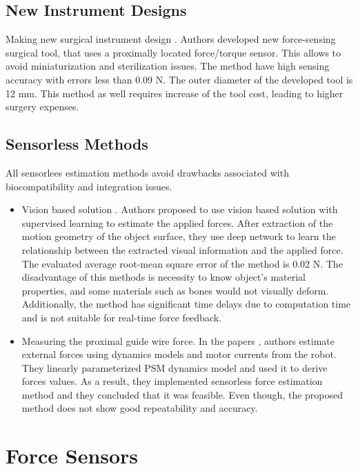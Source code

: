 \subsection{New Instrument Designs}
Making new surgical instrument design \cite{schwalb_forcesensing_2017}. Authors developed new force-sensing surgical tool, that uses a proximally located force/torque sensor. This allows to avoid miniaturization and sterilization issues. The method have high sensing accuracy with errors less than 0.09 N. The outer diameter of the developed tool is 12 mm. This method as well requires increase of the tool cost, leading to higher surgery expenses.

\subsection{Sensorless Methods}

All sensorlees estimation methods avoid drawbacks associated with biocompatibility and integration issues.

\begin{itemize}
\item Vision based solution \cite{aviles_towards_2017}. Authors proposed to use vision based solution with supervised learning to estimate the applied forces. After extraction of the motion geometry of the object surface, they use deep network to learn the relationship between the extracted visual information and the applied force. The evaluated average root-mean square error of the method is 0.02 N.  The disadvantage of this methods is necessity to know object’s material properties, and some materials such as bones would not visually deform. Additionally, the method has significant time delays due to computation time and is not suitable for real-time force feedback. 

\item Measuring the proximal guide wire force. In the papers \cite{sang_hongqiang_external_2017, yoon_design_2015}, authors estimate external forces using dynamics models and motor currents from the robot. They linearly parameterized PSM dynamics model and used it to derive forces values. As a result, they implemented sensorless force estimation method and they concluded that it was feasible. Even though, the proposed method does not show good repeatability and accuracy.
\end{itemize}

\section{Force Sensors}
\label{sec:ForceSensors}

